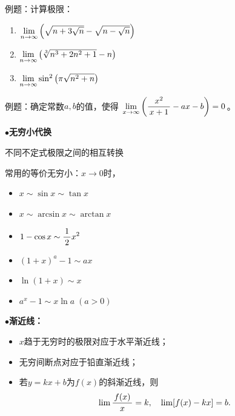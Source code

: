 例题：计算极限：
\begin{enumerate}[(1)]
  \setlength{\itemindent}{1cm}
  \item $\lim\limits_{n\to\infty}\left(\sqrt{n+3\sqrt n}-\sqrt{n-\sqrt{n}}\right)$
  \item $\lim\limits_{n\to\infty}\left(\sqrt[3]{n^3+2n^2+1}-n\right)$
  \item $\lim\limits_{n\to\infty}\sin^2\left(\pi\sqrt{n^2+n}\right)$
\end{enumerate}

例题：确定常数$a,b$的值，使得
$\lim\limits_{x\to{\infty}}\left(\displaystyle\frac{\,{x^2}\,}{\,{x+1}\,}-ax-b\right)=0$。

$\bullet${\bf 无穷小代换}

不同不定式极限之间的相互转换
\begin{center}
\end{center}

常用的等价无穷小：$x\to 0$时，
\begin{itemize}
  \setlength{\itemindent}{1cm}
  \item $x\sim \sin x\sim \tan x$ 
  \item $x \sim\arcsin x\sim\arctan x$ 
  \item $1-\cos x\sim \displaystyle\frac{\,{1}\,}{\,{2}\,} x^2$ 
  \item $(1+x)^a-1\sim ax$ 
  \item $\ln(1+x)\sim x$ 
  \item $a^x-1\sim x\ln a\;(a>0)$
\end{itemize}

$\bullet${\bf 渐近线：}
\begin{itemize}
  \setlength{\itemindent}{1cm}
  \item $x$趋于无穷时的极限对应于水平渐近线；
  \item 无穷间断点对应于铅直渐近线；
  \item 若$y=kx+b$为$f(x)$的斜渐近线，则
  $$\lim\displaystyle\frac{\,{f(x)}\,}{\,{x}\,}=k,\quad \lim[f(x)-kx]=b.$$
\end{itemize}

